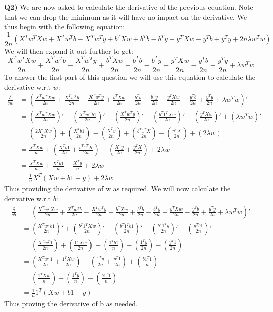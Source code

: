 \documentclass{article}
\begin{document}
\begin{titlepage}
\textbf{Q2)} We are now asked to calculate the derivative of the previous equation. Note that we can drop the minimum as it will have no impact on the derivative. We thus begin with the following equation:
\[ \frac{1}{2n} \left( X^Tw^TXw + X^Tw^Tb - X^Tw^Ty +b^TXw+ b^Tb -b^Ty -y^TXw -y^Tb + y^Ty + 2n\lambda w^Tw \right) \]
We will then expand it out further to get:
\[ \frac{X^Tw^TXw}{2n} + \frac{X^Tw^Tb}{2n} - \frac{X^Tw^Ty}{2n} +  \frac{b^TXw}{2n} + \frac{b^Tb}{2n} - \frac{b^Ty}{2n} -  \frac{y^TXw}{2n} - \frac{y^Tb}{2n} + \frac{y^Ty}{2n} + \lambda w^Tw \]
To answer the first part of this question we will use this equation to calculate the derivative w.r.t $w$:
\begin{align*} 
\frac{\delta}{\delta w} &=  \left( \frac{X^Tw^TXw}{2n} + \frac{X^Tw^Tb}{2n} - \frac{X^Tw^Ty}{2n} +  \frac{b^TXw}{2n} + \frac{b^Tb}{2n} - \frac{b^Ty}{2n} -  \frac{y^TXw}{2n} - \frac{y^Tb}{2n} + \frac{y^Ty}{2n} + \lambda w^Tw \right)' \\
&= \left( \frac{X^Tw^TXw}{2n} \right)' + \left( \frac{X^Tw^Tb1}{2n} \right)' -\left( \frac{X^Tw^Ty}{2n} \right)' + \left( \frac{b^T1^TXw}{2n} \right)' - \left( \frac{y^TXw}{2n} \right)' + \left( \lambda w^Tw \right)' \\
&= \left( \frac{2X^TXw}{2n} \right) + \left( \frac{X^Tb1}{2n} \right) -\left( \frac{X^Ty}{2n} \right) + \left( \frac{b^T1^TX}{2n} \right) - \left( \frac{y^TX}{2n} \right) + \left( 2\lambda w \right) \\
&= \frac{X^TXw}{n} + \left( \frac{X^Tb1}{2n} + \frac{b^T1^TX}{2n} \right) - \left( \frac{X^Ty}{2n} + \frac{y^TX}{2n} \right) +2\lambda w \\
&= \frac{X^TXw}{n} + \frac{X^Tb1}{n} - \frac{X^Ty}{n} +2\lambda w \\
&= \frac{1}{n}X^T \left(Xw + b1 - y  \right)+ 2\lambda w
\end{align*}
Thus providing the derivative of w as required. We will now calculate the derivative w.r.t $b$:
\begin{align*} 
\frac{\delta}{\delta b} &=  \left( \frac{X^Tw^TXw}{2n} + \frac{X^Tw^Tb}{2n} - \frac{X^Tw^Ty}{2n} +  \frac{b^TXw}{2n} + \frac{b^Tb}{2n} - \frac{b^Ty}{2n} -  \frac{y^TXw}{2n} - \frac{y^Tb}{2n} + \frac{y^Ty}{2n} + \lambda w^Tw \right)' \\
&=  \left( \frac{X^Tw^Tb1}{2n} \right)' + \left( \frac{b^T1^TXw}{2n} \right)' + \left( \frac{b^T1^Tb1}{2n} \right)' - \left( \frac{b^T1^Ty}{2n} \right)' - \left( \frac{y^Tb1}{2n} \right)' \\
&=  \left( \frac{X^Tw^T1}{2n} \right) + \left( \frac{1^TXw}{2n} \right) + \left( \frac{1^Tb1}{n} \right) - \left( \frac{1^Ty}{2n} \right) - \left( \frac{y^T1}{2n} \right) \\
&= \left( \frac{X^Tw^T1}{2n} + \frac{1^TXw}{2n} \right) - \left( \frac{1^Ty}{2n} + \frac{y^T1}{2n} \right) + \left( \frac{b1^T1}{n} \right) \\
&= \left( \frac{1^TXw}{n} \right) - \left( \frac{1^Ty}{n} \right) + \left( \frac{b1^T1}{n} \right) \\
&= \frac{1}{n}1^T \left(Xw + b1 - y  \right)
\end{align*}
Thus proving the derivative of b as needed. 
\end{titlepage}
\end{document}
